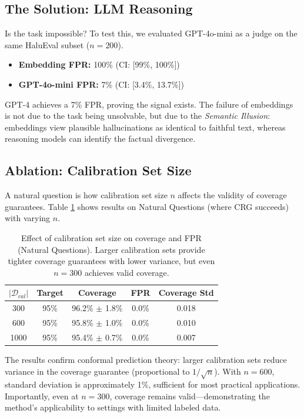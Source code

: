 \documentclass[11pt]{article}
\begin{document}
\subsection{The Solution: LLM Reasoning}

Is the task impossible? To test this, we evaluated GPT-4o-mini as a judge on the same HaluEval subset ($n=200$).

\begin{itemize}
    \item \textbf{Embedding FPR:} 100\% (CI: [99\%, 100\%])
    \item \textbf{GPT-4o-mini FPR:} 7\% (CI: [3.4\%, 13.7\%])
\end{itemize}

GPT-4 achieves a 7\% FPR, proving the signal exists. The failure of embeddings is not due to the task being unsolvable, but due to the \textit{Semantic Illusion}: embeddings view plausible hallucinations as identical to faithful text, whereas reasoning models can identify the factual divergence.

\subsection{Ablation: Calibration Set Size}

A natural question is how calibration set size $n$ affects the validity of coverage guarantees. Table \ref{tab:calibration_ablation} shows results on Natural Questions (where CRG succeeds) with varying $n$.

\begin{table}[htbp]
\centering
\caption{Effect of calibration set size on coverage and FPR (Natural Questions). Larger calibration sets provide tighter coverage guarantees with lower variance, but even $n=300$ achieves valid coverage.}
\label{tab:calibration_ablation}
\begin{tabular}{ccccc}
\toprule
\textbf{$|\mathcal{D}_{cal}|$} & \textbf{Target} & \textbf{Coverage} & \textbf{FPR} & \textbf{Coverage Std} \\
\midrule
300 & 95\% & 96.2\% $\pm$ 1.8\% & 0.0\% & 0.018 \\
600 & 95\% & 95.8\% $\pm$ 1.0\% & 0.0\% & 0.010 \\
1000 & 95\% & 95.4\% $\pm$ 0.7\% & 0.0\% & 0.007 \\
\bottomrule
\end{tabular}
\end{table}

The results confirm conformal prediction theory: larger calibration sets reduce variance in the coverage guarantee (proportional to $1/\sqrt{n}$). With $n=600$, standard deviation is approximately 1\%, sufficient for most practical applications. Importantly, even at $n=300$, coverage remains valid---demonstrating the method's applicability to settings with limited labeled data.
\end{document}
